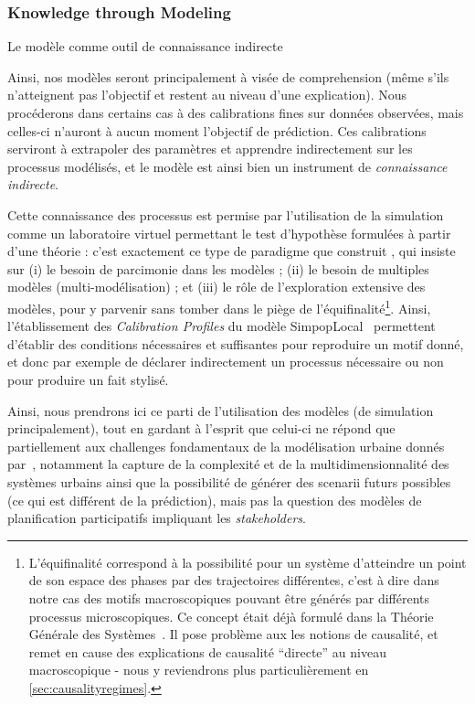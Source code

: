 \subsubsection{Knowledge through Modeling}{Le modèle comme outil de connaissance indirecte}



Ainsi, nos modèles seront principalement à visée de comprehension (même s'ils n'atteignent pas l'objectif et restent au niveau d'une explication). Nous procéderons dans certains cas à des calibrations fines sur données observées, mais celles-ci n'auront à aucun moment l'objectif de prédiction. Ces calibrations serviront à extrapoler des paramètres et apprendre indirectement sur les processus modélisés, et le modèle est ainsi bien un instrument de \emph{connaissance indirecte}.

Cette connaissance des processus est permise par l'utilisation de la simulation comme un laboratoire virtuel permettant le test d'hypothèse formulées à partir d'une théorie  : c'est exactement ce type de paradigme que construit \cite{pumain2017urban}, qui insiste sur (i) le besoin de parcimonie dans les modèles ; (ii) le besoin de multiples modèles (multi-modélisation) ; et (iii) le rôle de l'exploration extensive des modèles, pour y parvenir sans tomber dans le piège de l'équifinalité\footnote{L'équifinalité correspond à la possibilité pour un système d'atteindre un point de son espace des phases par des trajectoires différentes, c'est à dire dans notre cas des motifs macroscopiques pouvant être générés par différents processus microscopiques. Ce concept était déjà formulé dans la Théorie Générale des Systèmes~\cite{von1972history}. Il pose problème aux les notions de causalité, et remet en cause des explications de causalité ``directe'' au niveau macroscopique - nous y reviendrons plus particulièrement en \ref{sec:causalityregimes}.}. Ainsi, l'établissement des \emph{Calibration Profiles} du modèle SimpopLocal~\cite{reuillon2015} permettent d'établir des conditions nécessaires et suffisantes pour reproduire un motif donné, et donc par exemple de déclarer indirectement un processus nécessaire ou non pour produire un fait stylisé.

Ainsi, nous prendrons ici ce parti de l'utilisation des modèles (de simulation principalement), tout en gardant à l'esprit que celui-ci ne répond que partiellement aux challenges fondamentaux de la modélisation urbaine donnés par~\cite{perez2016agent}, notamment la capture de la complexité et de la multidimensionnalité des systèmes urbains ainsi que la possibilité de générer des scenarii futurs possibles (ce qui est différent de la prédiction), mais pas la question des modèles de planification participatifs impliquant les \emph{stakeholders}. 



